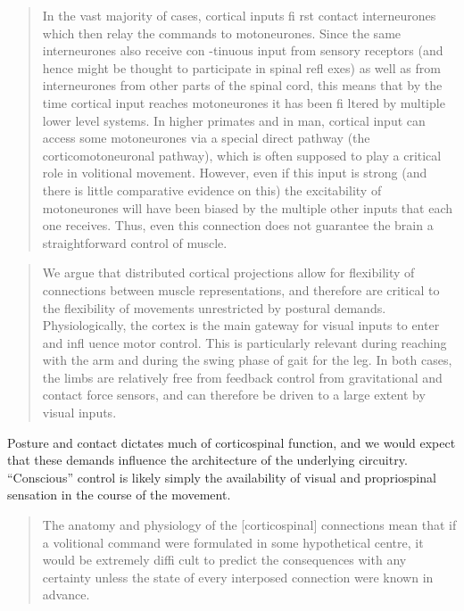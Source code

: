 \begin{quote}
In the vast majority of cases, cortical inputs fi rst contact
interneurones which then relay the commands to motoneurones. Since the
same interneurones also receive con -tinuous input from sensory
receptors (and hence might be thought to participate in spinal refl
exes) as well as from interneurones from other parts of the spinal cord,
this means that by the time cortical input reaches motoneurones it has
been fi ltered by multiple lower level systems. In higher primates and
in man, cortical input can access some motoneurones via a special direct
pathway (the corticomotoneuronal pathway), which is often supposed to
play a critical role in volitional movement. However, even if this input
is strong (and there is little comparative evidence on this) the
excitability of motoneurones will have been biased by the multiple other
inputs that each one receives. Thus, even this connection does not
guarantee the brain a straightforward control of muscle.
\end{quote}

\begin{quote}
We argue that distributed cortical projections allow for flexibility of
connections between muscle representations, and therefore are critical
to the flexibility of movements unrestricted by postural demands.
Physiologically, the cortex is the main gateway for visual inputs to
enter and infl uence motor control. This is particularly relevant during
reaching with the arm and during the swing phase of gait for the leg. In
both cases, the limbs are relatively free from feedback control from
gravitational and contact force sensors, and can therefore be driven to
a large extent by visual inputs.
\end{quote}

Posture and contact dictates much of corticospinal function, and we
would expect that these demands influence the architecture of the
underlying circuitry. ``Conscious'' control is likely simply the
availability of visual and propriospinal sensation in the course of the
movement.

\begin{quote}
The anatomy and physiology of the {[}corticospinal{]} connections mean
that if a volitional command were formulated in some hypothetical
centre, it would be extremely diffi cult to predict the consequences
with any certainty unless the state of every interposed connection were
known in advance.
\end{quote}

